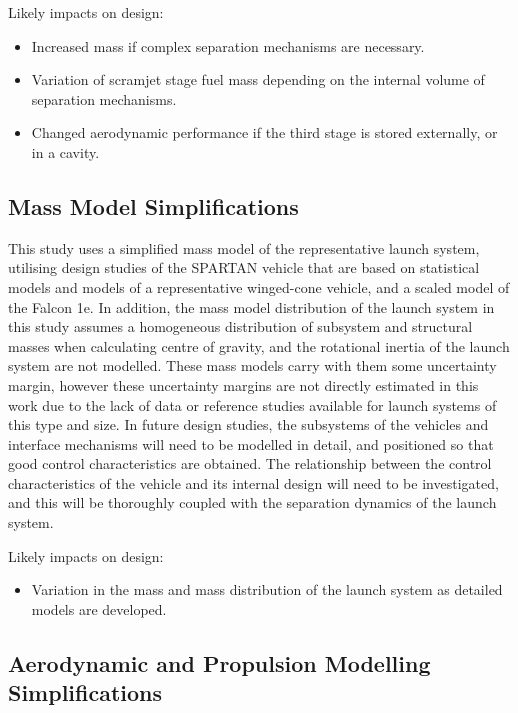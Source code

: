 Likely impacts on design:
\begin{itemize}[noitemsep,topsep=0pt]
	\item Increased mass if complex separation mechanisms are necessary.
	\item Variation of scramjet stage fuel mass depending on the internal volume of separation mechanisms. 
	\item Changed aerodynamic performance if the third stage is stored externally, or in a cavity. 
\end{itemize}


\subsection{Mass Model Simplifications}

This study uses a simplified mass model of the representative launch system, utilising design studies of the SPARTAN vehicle\cite{Preller2017b} that are based on statistical models and models of a representative winged-cone vehicle\cite{Preller2018}, and a scaled model of the Falcon 1e\cite{Vehicle2008}. In addition, the mass model distribution of the launch system in this study assumes a homogeneous distribution of subsystem and structural masses when calculating centre of gravity, and the rotational inertia of the launch system are not modelled.
These mass models carry with them some uncertainty margin, however these uncertainty margins are not directly estimated in this work due to the lack of data or reference studies available for launch systems of this type and size. 
In future design studies, the subsystems of the vehicles and interface mechanisms will need to be modelled in detail, and positioned so that good control characteristics are obtained. The relationship between the control characteristics of the vehicle and its internal design will need to be investigated, and this will be thoroughly coupled with the separation dynamics of the launch system. 

Likely impacts on design:
\begin{itemize}[noitemsep,topsep=0pt]
	\item Variation in the mass and mass distribution of the launch system as detailed models are developed. 
\end{itemize}

\subsection{Aerodynamic and Propulsion Modelling Simplifications}

